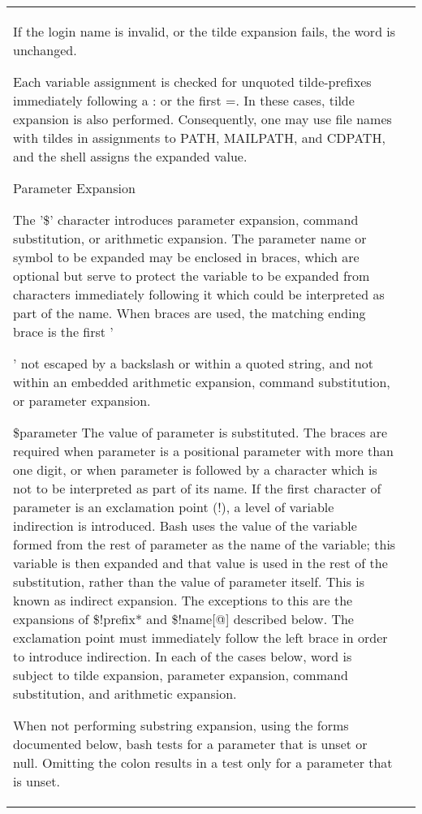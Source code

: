 \documentclass[11pt]{article}
\begin{document}
\begin{longtable}{p{}p{}}
{{If the login name is invalid, or the tilde expansion fails, the word is unchanged.

Each variable assignment is checked for unquoted tilde-prefixes immediately following a : or the first =. In these cases, tilde expansion is also performed. Consequently, one may use file names with tildes in assignments to PATH, MAILPATH, and CDPATH, and the shell assigns the expanded value.

Parameter Expansion

The '\$' character introduces parameter expansion, command substitution, or arithmetic expansion. The parameter name or symbol to be expanded may be enclosed in braces, which are optional but serve to protect the variable to be expanded from characters immediately following it which could be interpreted as part of the name.
When braces are used, the matching ending brace is the first '}' not escaped by a backslash or within a quoted string, and not within an embedded arithmetic expansion, command substitution, or parameter expansion.

\${parameter}
The value of parameter is substituted. The braces are required when parameter is a positional parameter with more than one digit, or when parameter is followed by a character which is not to be interpreted as part of its name.
If the first character of parameter is an exclamation point (!), a level of variable indirection is introduced. Bash uses the value of the variable formed from the rest of parameter as the name of the variable; this variable is then expanded and that value is used in the rest of the substitution, rather than the value of parameter itself. This is known as indirect expansion. The exceptions to this are the expansions of \${!prefix*} and \${!name[@]} described below. The exclamation point must immediately follow the left brace in order to introduce indirection.
In each of the cases below, word is subject to tilde expansion, parameter expansion, command substitution, and arithmetic expansion.

When not performing substring expansion, using the forms documented below, bash tests for a parameter that is unset or null. Omitting the colon results in a test only for a parameter that is unset.

}
\end{longtable}
\end{document}
